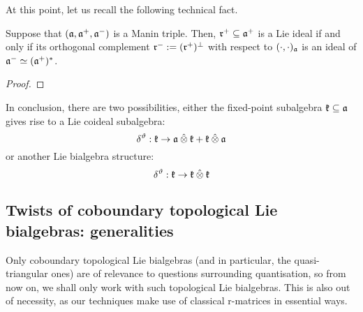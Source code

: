         At this point, let us recall the following technical fact.
        \begin{lemma} \label{lemma: polarisation_of_lie_ideals}
            Suppose that $(\mathfrak{a}, \mathfrak{a}^+, \mathfrak{a}^-)$ is a Manin triple. Then, $\mathfrak{r}^+ \subseteq \mathfrak{a}^+$ is a Lie ideal if and only if its orthogonal complement $\mathfrak{r}^- := (\mathfrak{r}^+)^{\perp}$ with respect to $(\cdot, \cdot)_{\mathfrak{a}}$ is an ideal of $\mathfrak{a}^- \simeq (\mathfrak{a}^+)^*$.
        \end{lemma}
            \begin{proof}
            \end{proof}
        
        In conclusion, there are two possibilities, either the fixed-point subalgebra $\mathfrak{k} \subseteq \mathfrak{a}$ gives rise to a Lie coideal subalgebra:
            $$\delta^{\vartheta}: \k \to \a \hattensor \k + \k \hattensor \a$$
        or another Lie bialgebra structure:
            $$\delta^{\vartheta}: \k \to \k \hattensor \k$$

    \subsection{Twists of coboundary topological Lie bialgebras: generalities} \label{subsection: twisted_coboundary_topological_lie_bialgebras_generalities}
        Only coboundary topological Lie bialgebras (and in particular, the quasi-triangular ones) are of relevance to questions surrounding quantisation, so from now on, we shall only work with such topological Lie bialgebras. This is also out of necessity, as our techniques make use of classical r-matrices in essential ways.

